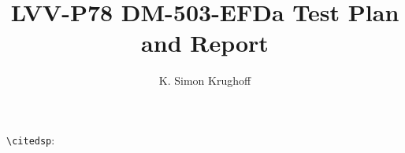 \documentclass[DM,lsstdraft,toc]{lsstdoc}
\begin{document}
\def\milestoneName{DM-503-EFDa}
\def\milestoneId{LVV-P78}
\def\product{Data Management}


\title{LVV-P78 DM-503-EFDa Test Plan and Report}
\setDocRef{\lsstDocType-\lsstDocNum}
\date{\vcsDate}
\author{K. Simon Krughoff}




\verb|\citedsp|: 


\end{document}
